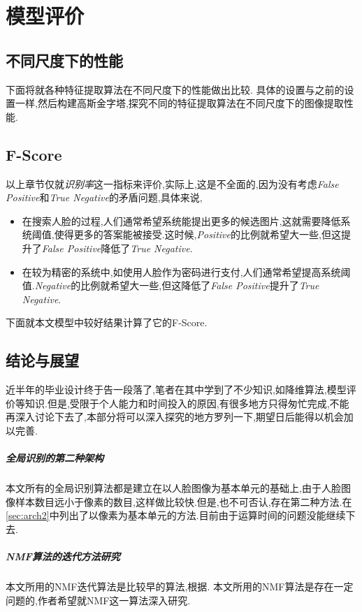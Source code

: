 \chapter{模型评价}
\section{不同尺度下的性能}
下面将就各种特征提取算法在不同尺度下的性能做出比较. 具体的设置与之前的设置一样,然后构建高斯金字塔,探究不同的特征提取算法在不同尺度下的图像提取性能.

\section{F-Score}
以上章节仅就\textit{识别率}这一指标来评价,实际上,这是不全面的,因为没有考虑\textit{False Positive}和\textit{True Negative}的矛盾问题,具体来说,
\begin{itemize}
	\item 在搜索人脸的过程,人们通常希望系统能提出更多的候选图片,这就需要降低系统阈值,使得更多的答案能被接受.这时候,\textit{Positive}的比例就希望大一些,但这提升了\textit{False Positive}降低了\textit{True Negative}.
	\item 在较为精密的系统中,如使用人脸作为密码进行支付,人们通常希望提高系统阈值.\textit{Negative}的比例就希望大一些,但这降低了\textit{False Positive}提升了\textit{True Negative}.
\end{itemize} 
下面就本文模型中较好结果计算了它的F-Score.


\section{结论与展望}

近半年的毕业设计终于告一段落了,笔者在其中学到了不少知识,如降维算法,模型评价等知识.但是,受限于个人能力和时间投入的原因,有很多地方只得匆忙完成,不能再深入讨论下去了,本部分将可以深入探究的地方罗列一下,期望日后能得以机会加以完善.

\paragraph{全局识别的第二种架构}
本文所有的全局识别算法都是建立在以人脸图像为基本单元的基础上,由于人脸图像样本数目远小于像素的数目,这样做比较快.但是,也不可否认,存在第二种方法.在\ref{sec:arch2}中列出了以像素为基本单元的方法.目前由于运算时间的问题没能继续下去.

\paragraph{NMF算法的迭代方法研究}
本文所用的NMF迭代算法是比较早的算法,根据\cite{lin2007projected}. 本文所用的NMF算法是存在一定问题的,作者希望就NMF这一算法深入研究.

